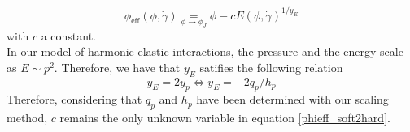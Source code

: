 \documentclass[class=article, float=false, crop=false]{standalone}
\begin{document}
\begin{equation}
\phi_{\text{eff}}(\phi,\dot{\gamma})\operatorname*{~=~}_{\phi\rightarrow\phi_J}\phi-cE(\phi,\dot{\gamma})^{1/y_E}
\label{phieff_soft2hard}
\end{equation}
with $c$ a constant.\\

In our model of harmonic elastic interactions, the pressure and the energy scale as $E \sim p^2$. Therefore, we have that $y_E$ satifies the following relation
\begin{equation}
y_E = 2y_p \Leftrightarrow y_E = -2q_p/h_p
\end{equation}
Therefore, considering that $q_p$ and $h_p$ have been determined with our scaling method, $c$ remains the only unknown variable in equation \ref{phieff_soft2hard}.\\
\end{document}
